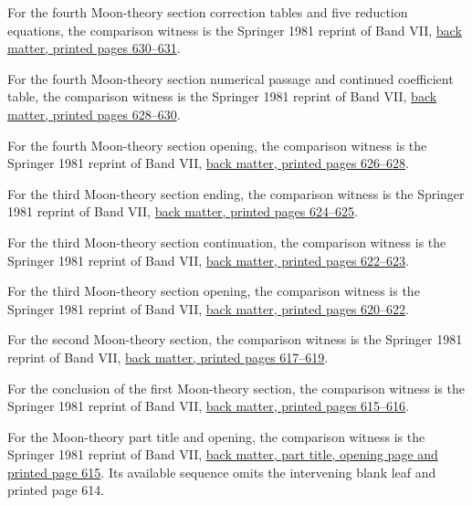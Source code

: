 For the fourth Moon-theory section correction tables and five reduction equations, the comparison witness is the Springer 1981 reprint of Band VII, \href{https://link.springer.com/content/pdf/bbm:978-3-642-92478-1/1}{back matter, printed pages 630--631}.



For the fourth Moon-theory section numerical passage and continued coefficient table, the comparison witness is the Springer 1981 reprint of Band VII, \href{https://link.springer.com/content/pdf/bbm:978-3-642-92478-1/1}{back matter, printed pages 628--630}.



For the fourth Moon-theory section opening, the comparison witness is the Springer 1981 reprint of Band VII, \href{https://link.springer.com/content/pdf/bbm:978-3-642-92478-1/1}{back matter, printed pages 626--628}.



For the third Moon-theory section ending, the comparison witness is the Springer 1981 reprint of Band VII, \href{https://link.springer.com/content/pdf/bbm:978-3-642-92478-1/1}{back matter, printed pages 624--625}.



For the third Moon-theory section continuation, the comparison witness is the Springer 1981 reprint of Band VII, \href{https://link.springer.com/content/pdf/bbm:978-3-642-92478-1/1}{back matter, printed pages 622--623}.



For the third Moon-theory section opening, the comparison witness is the Springer 1981 reprint of Band VII, \href{https://link.springer.com/content/pdf/bbm:978-3-642-92478-1/1}{back matter, printed pages 620--622}.



For the second Moon-theory section, the comparison witness is the Springer 1981 reprint of Band VII, \href{https://link.springer.com/content/pdf/bbm:978-3-642-92478-1/1}{back matter, printed pages 617--619}.



For the conclusion of the first Moon-theory section, the comparison witness is the Springer 1981 reprint of Band VII, \href{https://link.springer.com/content/pdf/bbm:978-3-642-92478-1/1}{back matter, printed pages 615--616}.



For the Moon-theory part title and opening, the comparison witness is the Springer 1981 reprint of Band VII, \href{https://link.springer.com/content/pdf/bbm:978-3-642-92478-1/1}{back matter, part title, opening page and printed page 615}. Its available sequence omits the intervening blank leaf and printed page 614.



